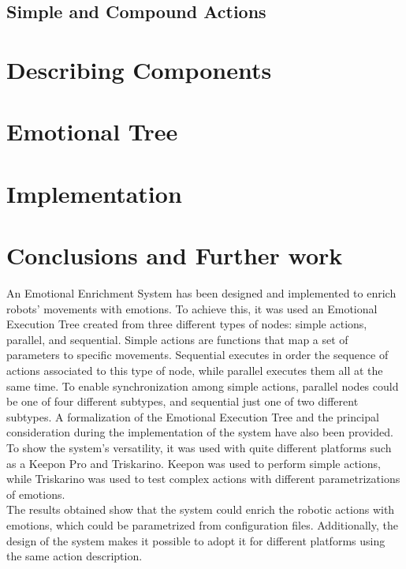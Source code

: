 \documentclass[letterpaper, 10 pt, conference]{ieeeconf}  %
\begin{document}
\subsection{Simple and Compound Actions}
 
\section{Describing Components}

\section{Emotional Tree}

\section{Implementation}

\section{Conclusions and Further work}
An Emotional Enrichment System has been designed and implemented to enrich robots' movements with emotions. To achieve this, it was used an Emotional Execution Tree created from three different types of nodes: simple actions, parallel, and sequential. Simple actions are functions that map a set of parameters to specific movements. Sequential executes in order the sequence of actions associated to this type of node, while parallel executes them all at the same time. To enable synchronization among simple actions, parallel nodes could be one of four different subtypes, and sequential just one of two different subtypes. A formalization of the Emotional Execution Tree and the principal consideration during the implementation of the system have also been provided. To show the system's versatility, it was used with quite different platforms such as a Keepon Pro and Triskarino. Keepon was used to perform simple actions, while Triskarino was used to test complex actions with different parametrizations of emotions.\\
The results obtained show that the system could enrich the robotic actions with emotions, which could be parametrized from configuration files. Additionally, the design of the system makes it possible to  adopt it for different platforms using the same action description.
%



\addtolength{\textheight}{-12cm}
\end{document}
